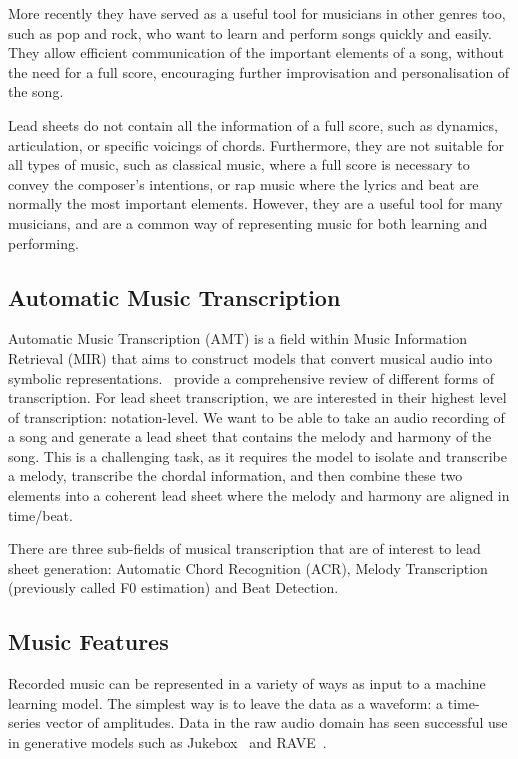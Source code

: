 More recently they have served as a useful tool for musicians in other genres too, such as pop and rock, who want to learn and perform songs quickly and easily. They allow efficient communication of the important elements of a song, without the need for a full score, encouraging further improvisation and personalisation of the song.

Lead sheets do not contain all the information of a full score, such as dynamics, articulation, or specific voicings of chords. Furthermore, they are not suitable for all types of music, such as classical music, where a full score is necessary to convey the composer's intentions, or rap music where the lyrics and beat are normally the most important elements. However, they are a useful tool for many musicians, and are a common way of representing music for both learning and performing.

\subsection{Automatic Music Transcription}

Automatic Music Transcription (AMT) is a field within Music Information Retrieval (MIR) that aims to construct models that convert musical audio into symbolic representations.~\citep{ComprehensiveReviewMusicTranscription} provide a comprehensive review of different forms of transcription. For lead sheet transcription, we are interested in their highest level of transcription: notation-level. We want to be able to take an audio recording of a song and generate a lead sheet that contains the melody and harmony of the song. This is a challenging task, as it requires the model to isolate and transcribe a melody, transcribe the chordal information, and then combine these two elements into a coherent lead sheet where the melody and harmony are aligned in time/beat.

There are three sub-fields of musical transcription that are of interest to lead sheet generation: Automatic Chord Recognition (ACR), Melody Transcription (previously called F0 estimation) and Beat Detection.

\subsection{Music Features}\label{sec:background-features}

Recorded music can be represented in a variety of ways as input to a machine learning model. The simplest way is to leave the data as a waveform: a time-series vector of amplitudes. Data in the raw audio domain has seen successful use in generative models such as Jukebox~\citep{Jukebox} and RAVE~\citep{RAVE}.

